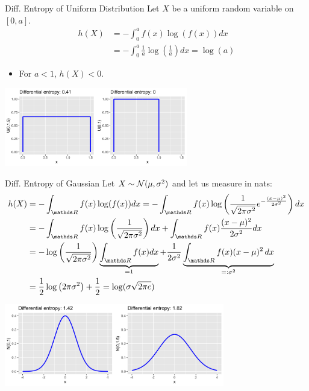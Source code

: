 \documentclass[11pt,compress,t,notes=noshow, xcolor=table]{beamer}
\begin{document}
\begin{vbframe}{Diff. Entropy of Uniform Distribution}
Let $X$ be a uniform random variable on $[0, a]$.
  \begin{equation*}
    \begin{aligned} 
      h(X) &= - \int_0^a f(x) \log(f(x)) dx \\
           &= - \int_0^a \frac{1}{a} \log\left(\frac{1}{a}\right) dx = \log(a) 
    \end{aligned}
  \end{equation*}
  \begin{itemize}
    \item For $a < 1$, $h(X) < 0$.
    \end{itemize}
    
    \begin{center}
    \includegraphics[width = 8cm ]{figure/uni_entropy.png}
    \end{center}
    
\end{vbframe}


\begin{vbframe}{Diff. Entropy of Gaussian}
Let $X \sim \mathcal{N}(\mu, \sigma^2)$ and let us measure in nats:
\vspace{-0.2cm}
{\small
  \begin{equation*}
    \begin{aligned} 
     h(X) &= - \int_{\R} f(x) \log(f(x)) dx =  - \int_{\R} f(x) \log\left(\frac{1}{\sqrt{2 \pi \sigma^{2}}} e^{-\frac{(x-\mu)^{2}}{2 \sigma^{2}}} \right) dx \\
          &= - \int_{\R} f(x) \log\left(\frac{1}{\sqrt{2 \pi \sigma^{2}}}\right) dx + \int_{\R} f(x) \frac{(x-\mu)^{2}}{2 \sigma^{2}} dx \\
          &= - \log \left(\frac{1}{\sqrt{2 \pi \sigma^{2}}}\right) \underbrace{\int_{\R} f(x) dx}_{= 1} + \frac{1}{2\sigma^2} \underbrace{\int_{\R} f(x) (x-\mu)^{2}\,dx}_{=: \sigma^2} \\
          &= \frac{1}{2} \log \left(2 \pi \sigma^{2}\right) + \frac{1}{2} =  \log(\sigma \sqrt{2\pi e})
    \end{aligned}
  \end{equation*}
  } \vspace{-0.5cm}
\begin{center}
    \includegraphics[width = 0.72\textwidth]{figure/normal_entropy.png}
\end{center}
\end{vbframe}
\end{document}
